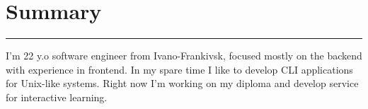 {
    \section*{Summary}
    \par\noindent\rule{\textwidth}{0.1mm}

    {\vspace{0.5cm}}
    I'm 22 y.o software engineer from Ivano-Frankivsk, focused mostly on the backend with experience in frontend.
    In my spare time I like to develop CLI applications for Unix-like systems.
    Right now I'm working on my diploma and develop service for interactive learning.
}